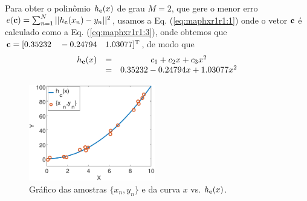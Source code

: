 \begin{SolutionT}\label{sol:theo:maphxr1r1}
Para obter o polinômio $h_{\VECTOR{c}}(x)$ de grau $M=2$, 
que gere o menor erro $e(\VECTOR{c}) =  \sum_{n=1}^{N} ||h_{\VECTOR{c}}(x_n)-y_n||^2$,
usamos a Eq. (\ref{eq:maphxr1r1:1}) onde o vetor $\VECTOR{c}$ é calculado como a Eq. (\ref{eq:maphxr1r1:3}),
onde obtemos que $\VECTOR{c}=[0.35232\quad -0.24794\quad 1.03077]^{\transpose}$, de modo que
\begin{equation}
\begin{matrix}
h_{\VECTOR{c}}(x) & = & c_1+c_2 x+c_3 x^2 \\
                ~ & = & 0.35232 -0.24794 x + 1.03077 x^2
\end{matrix}
\end{equation}
    \begin{figure}[!h]
        \centering
        \includegraphics[width=0.49\textwidth]{chapters/mapeamento/mfiles/mapeamentor1r1/minimizando_hx.eps}
        \caption{Gráfico das amostras $\{x_n,y_n\}$ e da curva $x$ vs. $h_{\VECTOR{c}}(x)$.}
        \label{fig:theo:maphxr1r1:xnyn}
    \end{figure}

\end{SolutionT}


